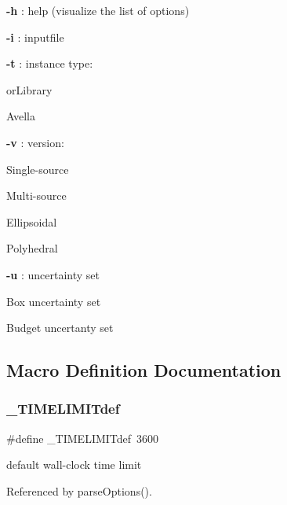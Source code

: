 \begin{DoxyItemize}
\item {\bfseries -\/h} \+: help (visualize the list of options)
\item {\bfseries -\/i} \+: inputfile
\item {\bfseries -\/t} \+: instance type\+:
\begin{DoxyEnumerate}
\item or\+Library
\item Avella
\end{DoxyEnumerate}
\item {\bfseries -\/v} \+: version\+:
\begin{DoxyEnumerate}
\item Single-\/source
\item Multi-\/source
\item Ellipsoidal
\item Polyhedral
\end{DoxyEnumerate}
\item {\bfseries -\/u} \+: uncertainty set
\begin{DoxyEnumerate}
\item Box uncertainty set
\item Budget uncertanty set 
\end{DoxyEnumerate}
\end{DoxyItemize}

\subsection{Macro Definition Documentation}
\mbox{\label{options_8cpp_a5021799111603289a1084abb31211d59}} 
\subsubsection{\+\_\+\+T\+I\+M\+E\+L\+I\+M\+I\+Tdef}
{\footnotesize\ttfamily \#define \+\_\+\+T\+I\+M\+E\+L\+I\+M\+I\+Tdef~3600}



default wall-\/clock time limit 



Referenced by parse\+Options().

\mbox{\label{options_8cpp_a23960294bead220b397fe29bcb293ac5}} 
